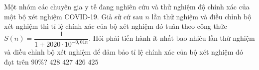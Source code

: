 \begin{ex}
	Một nhóm các chuyên gia y tế đang nghiên cứu và thử nghiệm độ chính xác của một bộ xét nghiệm COVID-19. Giả sử cứ sau $n$ lần thử nghiệm và điều chỉnh bộ xét nghiệm thì tỉ lệ chính xác của bộ xét nghiệm đó tuân theo công thức $S(n)=\dfrac{1}{1+2020\cdot 10^{-0{,}01n}}$. Hỏi phải tiến hành ít nhất bao nhiêu lần thử nghiệm và điều chỉnh bộ xét nghiệm để đảm bảo tỉ lệ chính xác của bộ xét nghiệm đó đạt trên $90\%$?
	\choice
	{$428$}
	{$427$}
	{\True $426$}
	{$425$}
\end{ex}
